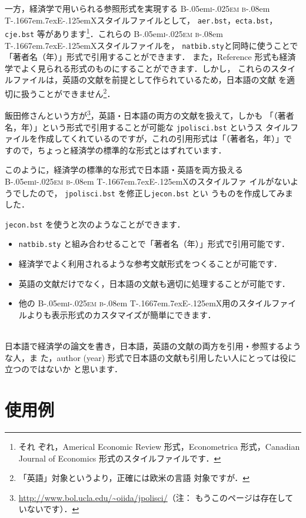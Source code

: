 \documentclass[article]{jlreq}
\newcommand{\BibTeX}{\textrm{B\kern-.05em\textsc{i\kern-.025em b}\kern-.08em%
T\kern-.1667em\lower.7ex\hbox{E}\kern-.125emX}}
\begin{document}
一方，経済学で用いられる参照形式を実現する \BibTeX スタイルファイルとして，
\texttt{aer.bst}，\texttt{ecta.bst}，\texttt{cje.bst} 等があります\footnote{それ
ぞれ，Americal Economic Review 形式，Econometrica 形式，Canadian Journal of
Economics 形式のスタイルファイルです．}．これらの \BibTeX スタイルファイルを，
\texttt{natbib.sty}と同時に使うことで「著者名（年）」形式で引用することができます．
また，Reference 形式も経済学でよく見られる形式のものにすることができます．しかし，
これらのスタイルファイルは，英語の文献を前提として作られているため，日本語の文献
を適切に扱うことができません\footnote{「英語」対象というより，正確には欧米の言語
対象ですが．}．

飯田修さんという方が\footnote{\url{http://www.bol.ucla.edu/~oiida/jpolisci/}（注：
もうこのページは存在していないです）．}，英語・日本語の両方の文献を扱えて，しかも
「（著者名，年）」という形式で引用することが可能な \texttt{jpolisci.bst} というス
タイルファイルを作成してくれているのですが，これの引用形式は「（著者名，年）」で
すので，ちょっと経済学の標準的な形式とはずれています．

このように，経済学の標準的な形式で日本語・英語を両方扱える \BibTeX のスタイルファ
イルがないようでしたので， \texttt{jpolisci.bst} を修正し\texttt{jecon.bst} とい
うものを作成してみました．
\vspace*{1em}

\texttt{jecon.bst} を使うと次のようなことができます．
\\

\begin{screen}
 \begin{itemize}
 \item \texttt{natbib.sty} と組み合わせることで「著者名（年）」形式で引用可能です．
 \item 経済学でよく利用されるような参考文献形式をつくることが可能です．
 \item 英語の文献だけでなく，日本語の文献も適切に処理することが可能です．
 \item 他の \BibTeX 用のスタイルファイルよりも表示形式のカスタマイズが簡単にできます．
 \end{itemize}
\end{screen}
\\

日本語で経済学の論文を書き，日本語，英語の文献の両方を引用・参照するような人，ま
た，author (year) 形式で日本語の文献も引用したい人にとっては役に立つのではないか
と思います．

\section{使用例}
\end{document}
